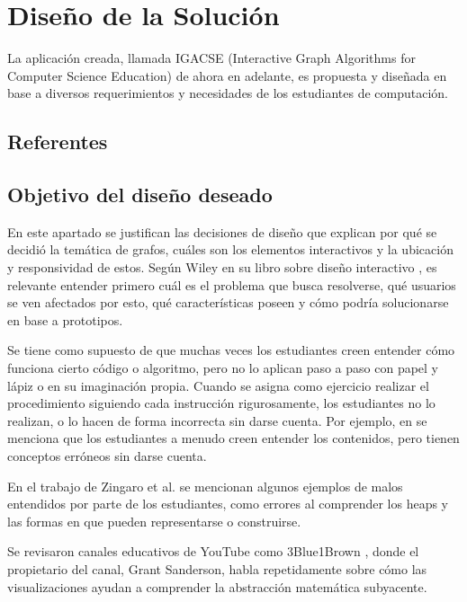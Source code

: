 \chapter{Diseño de la Solución}

La aplicación creada, llamada IGACSE (Interactive Graph Algorithms for Computer Science Education) de ahora en adelante, es propuesta y diseñada en base a diversos requerimientos y necesidades de los estudiantes de computación.

\section{Referentes}


\section{Objetivo del diseño deseado}

En este apartado se justifican las decisiones de diseño que explican por qué se decidió la temática de grafos, cuáles son los elementos interactivos y la ubicación y responsividad de estos. Según Wiley en su libro sobre diseño interactivo \cite{Rogers2002InteractionDesign}, es relevante entender primero cuál es el problema que busca resolverse, qué usuarios se ven afectados por esto, qué características poseen y cómo podría solucionarse en base a prototipos.

Se tiene como supuesto de que muchas veces los estudiantes creen entender cómo funciona cierto código o algoritmo, pero no lo aplican paso a paso con papel y lápiz o en su imaginación propia. Cuando se asigna como ejercicio realizar el procedimiento siguiendo cada instrucción rigurosamente, los estudiantes no lo realizan, o lo hacen de forma incorrecta sin darse cuenta. Por ejemplo, en \cite{IdentifyingStudentDifficultiesDataStructures} se menciona que los estudiantes a menudo creen entender los contenidos, pero tienen conceptos erróneos sin darse cuenta.

En el trabajo de Zingaro et al. \cite{IdentifyingStudentDifficultiesDataStructures} se mencionan algunos ejemplos de malos entendidos por parte de los estudiantes, como errores al comprender los heaps y las formas en que pueden representarse o construirse. 

Se revisaron canales educativos de YouTube como 3Blue1Brown \cite{3Blue1BrownYT}, donde el propietario del canal, Grant Sanderson, habla repetidamente sobre cómo las visualizaciones ayudan a comprender la abstracción matemática subyacente.

